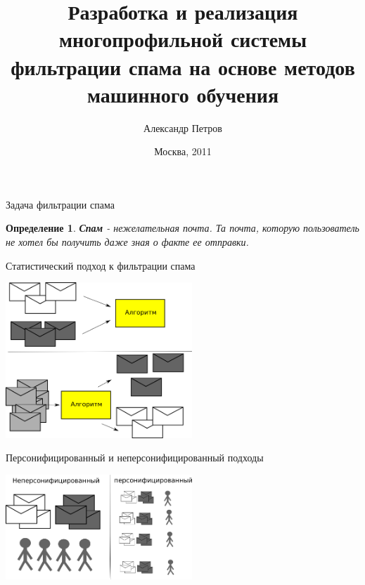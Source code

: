 \documentclass{beamer}
\newtheorem{define}{Определение}
\begin{document}
\title{Разработка и реализация многопрофильной системы фильтрации спама на основе методов машинного обучения}
\author{Александр Петров}
\date{Москва, 2011}
\frame{\titlepage}

\begin{frame}{Задача фильтрации спама}
    \begin{define}
        \textbf{Спам} - нежелательная почта. Та почта, которую пользователь не хотел бы получить даже зная о факте ее отправки.
    \end{define}
\end{frame}

\begin{frame}{Статистический подход к фильтрации спама}
\begin{center}
    \includegraphics[width=7cm]{img/statmethod}
\end{center}
\end{frame}

\begin{frame}{Персонифицированный и неперсонифицированный подходы}
\begin{center}
    \includegraphics[width=7cm]{img/pers_nopers}
\end{center}
\end{frame}
\end{document}
